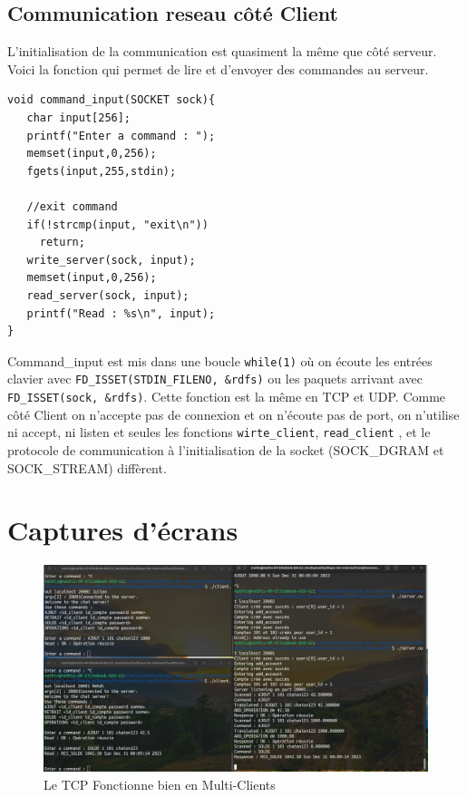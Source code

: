 \documentclass{article}
\begin{document}
\subsection{Communication reseau côté Client }

L'initialisation de la communication est quasiment la même que côté serveur. 
Voici la fonction qui permet de lire et d'envoyer des commandes au serveur.
\begin{verbatim}
void command_input(SOCKET sock){
   char input[256];
   printf("Enter a command : ");
   memset(input,0,256);
   fgets(input,255,stdin);

   //exit command
   if(!strcmp(input, "exit\n"))
     return;
   write_server(sock, input);
   memset(input,0,256);
   read_server(sock, input);
   printf("Read : %s\n", input);
}
\end{verbatim}

Command\_input est mis dans une boucle \texttt{while(1)} où on écoute les entrées clavier avec \newline \texttt{FD_ISSET(STDIN_FILENO, &rdfs)} ou les paquets arrivant avec  \texttt{FD_ISSET(sock, &rdfs)}. Cette fonction est la même en TCP et UDP. Comme côté Client on n'accepte pas de connexion et on n'écoute pas de port, on n'utilise ni accept, ni listen et seules les fonctions \texttt{wirte_client}, \texttt{read_client} , et le protocole de communication à l'initialisation de la socket (SOCK\_DGRAM et SOCK\_STREAM) diffèrent.

\section{Captures d'écrans }

\begin{figure}[h]
    \hspace*{-2cm}  
    \includegraphics[width=1.25\linewidth]{TCPmultiClients.png}
    \caption{\label{fig:TCPmultiClients}Le TCP Fonctionne bien en Multi-Clients}
\end{figure}
\end{document}
